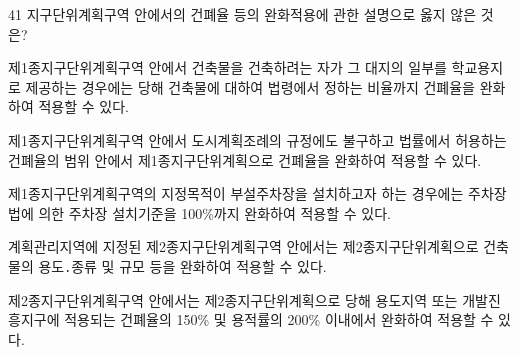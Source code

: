 \begin{question}{41}
지구단위계획구역 안에서의 건폐율 등의 완화적용에 관한 설명으로 옳지 않은 것은?
\begin{choices}
  \item 제1종지구단위계획구역 안에서 건축물을 건축하려는 자가 그 대지의 일부를 학교용지로 제공하는 경우에는 당해 건축물에 대하여 법령에서 정하는 비율까지 건폐율을 완화하여 적용할 수 있다.
  \item 제1종지구단위계획구역 안에서 도시계획조례의 규정에도 불구하고 법률에서 허용하는 건폐율의 범위 안에서 제1종지구단위계획으로 건폐율을 완화하여 적용할 수 있다.
  \item 제1종지구단위계획구역의 지정목적이 부설주차장을 설치하고자 하는 경우에는 주차장법에 의한 주차장 설치기준을 100\%까지 완화하여 적용할 수 있다.
  \item 계획관리지역에 지정된 제2종지구단위계획구역 안에서는 제2종지구단위계획으로 건축물의 용도․종류 및 규모 등을 완화하여 적용할 수 있다.
  \item 제2종지구단위계획구역 안에서는 제2종지구단위계획으로 당해 용도지역 또는 개발진흥지구에 적용되는 건폐율의 150\% 및 용적률의 200\% 이내에서 완화하여 적용할 수 있다.
\end{choices}
\end{question}
